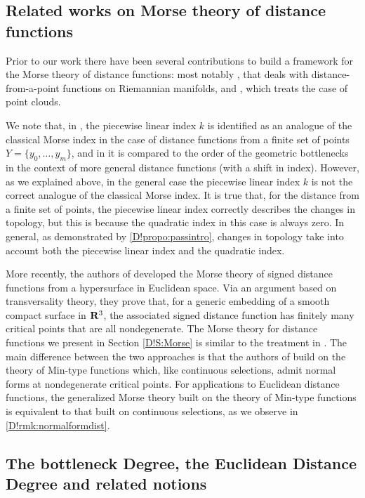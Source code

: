 \subsection{Related works on Morse theory of distance functions}
\label{D!sec:related}

Prior to our work there have been several contributions to build a framework for the Morse theory of distance functions: most notably \cite{cheeger}, that deals with distance-from-a-point functions on Riemannian manifolds, and \cite{bobrowski2014distance}, which treats the case of point clouds. 

We note that, in \cite{bobrowski2014distance}, the piecewise linear index $k$ is identified as an analogue of the classical Morse index in the case of distance functions from a finite set of points $Y = \{y_0, \ldots, y_m\}$, and in \cite[Remark 4.2]{DEEGH2023} it is compared to the order of the geometric bottlenecks in the context of more general distance functions (with a shift in index). However, as we explained above, in the general case the piecewise linear index $k$ is not the correct analogue of the classical Morse index. It is true that, for the distance from a finite set of points, the piecewise linear index correctly describes the changes in topology, but this is because the quadratic index in this case is always zero. In general, as demonstrated by \cref{D!propo:passintro}, changes in topology take into account both the piecewise linear index and the quadratic index.

More recently, the authors of \cite{SYM2025} developed the Morse theory of signed distance functions from a hypersurface in Euclidean space. Via an argument based on transversality theory, they prove that, for a generic embedding of a smooth compact surface in $\mathbf{R}^3$, the associated signed distance function has finitely many critical points that are all nondegenerate. 
The Morse theory for distance functions we present in Section \ref{D!S:Morse} is similar to the treatment in \cite[Sect.~3]{SYM2025}. The main difference between the two approaches is that the authors of \cite{SYM2025} build on the theory of Min-type functions \cite{gershkovich1997morse} which, like continuous selections, admit normal forms at nondegenerate critical points.
For applications to Euclidean distance functions, the generalized Morse theory built on the theory of Min-type functions is equivalent to that built on continuous selections, as we observe in \cref{D!rmk:normalformdist}.

\subsection{The bottleneck Degree, the Euclidean Distance Degree and related notions}

